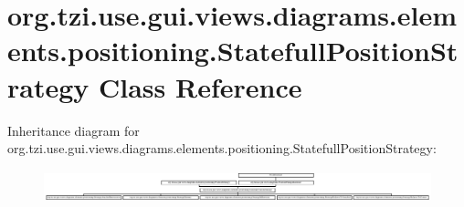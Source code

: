 \hypertarget{classorg_1_1tzi_1_1use_1_1gui_1_1views_1_1diagrams_1_1elements_1_1positioning_1_1_statefull_position_strategy}{\section{org.\-tzi.\-use.\-gui.\-views.\-diagrams.\-elements.\-positioning.\-Statefull\-Position\-Strategy Class Reference}
\label{classorg_1_1tzi_1_1use_1_1gui_1_1views_1_1diagrams_1_1elements_1_1positioning_1_1_statefull_position_strategy}
}
Inheritance diagram for org.\-tzi.\-use.\-gui.\-views.\-diagrams.\-elements.\-positioning.\-Statefull\-Position\-Strategy\-:\begin{figure}[H]
\begin{center}
\leavevmode
\includegraphics[height=0.945148cm]{classorg_1_1tzi_1_1use_1_1gui_1_1views_1_1diagrams_1_1elements_1_1positioning_1_1_statefull_position_strategy}
\end{center}
\end{figure}
